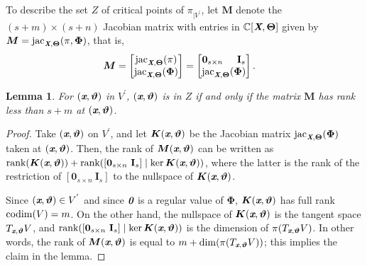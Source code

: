 \documentclass[a4paper]{article}
\def\bz{\textit{\textbf{0}}}
\def\Xb{\textit{\textbf{X}}}
\def\Thetab{\bm{\Theta}}
\def\thetab{\bm{\vartheta}}
\def\xb{\textit{\textbf{x}}}
\DeclareMathOperator{\jac}{jac}
\def\dt{s}
\def\C{\mathbb{C}}
\def\bbm{\begin{bmatrix}}
\def\ebm{\end{bmatrix}}
\newtheorem{lemma}[theorem]{Lemma}
\begin{document}
    To describe the set $Z$ of critical points of $\pi_{|V^{'}}$, let $\bm M$
    denote the $(s+m) \times (s+n)$ Jacobian matrix with entries in
    $\C[\Xb,\Thetab]$ given by $\bm M = \jac_{\Xb,\Thetab}(\pi,\bm\Phi)$,
    that is,
    \begin{align*}
    \bm M &= 
    \bbm 
    \jac_{\Xb,\Thetab}(\pi)\\
    \jac_{\Xb,\Thetab}(\bm\Phi) 
    \ebm 
    =
    \bbm 
    \textbf{0}_{\dt \times n}\hspace{5mm}\textbf{I}_{\dt} \\
    \jac_{\Xb,\Thetab}(\bm\Phi)
    \ebm.
    \end{align*}

    \begin{lemma} 
      For $(\xb,\thetab)$ in $V^{'}$, $(\xb,\thetab)$ is in $Z$ if and only if
      the matrix $\bm M$ has rank less than $\dt+m$ at $(\xb,\thetab)$.
    \end{lemma}
    \begin{proof}
      Take $(\xb,\thetab)$ on $V^{'}$, and let $\bm K(\xb,\thetab)$ be the
      Jacobian matrix $\jac_{\Xb,\Thetab}(\bm\Phi)$ taken at $(\xb,\thetab)$.
      Then, the rank of $\bm M(\xb,\thetab)$ can be written as
      $\textup{rank}(\bm K(\xb,\thetab)) + \textup{rank}([\textbf{0}_{\dt
          \times n}~\textbf{I}_{\dt}] \mid \ker \bm K(\xb,\thetab))$, where
      the latter is the rank of the restriction of $[\textbf{0}_{\dt
          \times n}~\textbf{I}_{\dt}]$ to the nullspace of
      $\bm K(\xb,\thetab)$.
    
      Since $(\xb,\thetab) \in V^{'}$ and since $\bz$ is a regular value of $\bm \Phi$, $\bm K(\xb,\thetab)$ has full rank ${\rm codim}
      (V) = m$. On the other hand, the nullspace of $\bm K(\xb,\thetab)$
      is the tangent space $T_{\xb,\thetab} V$, and
      $\textup{rank}([\textbf{0}_{\dt \times n}~\textbf{I}_{\dt}] \mid
      \ker \bm K(\xb,\thetab))$ is the dimension of $\pi(T_{\xb,\thetab}
      V)$.  In other words, the rank of $\bm M(\xb,\thetab)$ is equal to
      $m+\dim(\pi(T_{\xb,\thetab} V))$; this implies the claim in the
      lemma.
    \end{proof}
\end{document}
